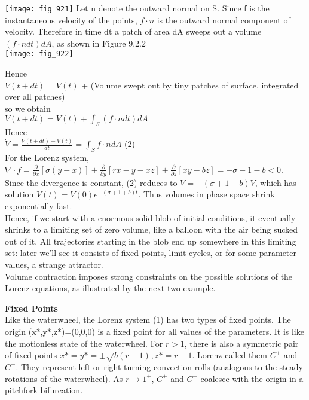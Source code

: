 \documentclass{article}
\newcommand\tab[1][1cm]{\hspace*{#1}}
\begin{document}
\texttt{[image: fig\_921]}
Let n denote the outward normal on S. Since f is the instantaneous velocity of the points, $f \cdot n$ is the outward normal component of velocity. Therefore in time dt a patch of area dA sweeps out a volume $(f \cdot n dt)dA$, as shown in Figure 9.2.2 \\

\texttt{[image: fig\_922]}

Hence \\ \tab \tab
$V(t+dt)=V(t)$ + (Volume swept out by tiny patches of surface, integrated over all patches) \\
so we obtain \\ \tab \tab
$V(t+dt)=V(t)+\int_{S}(f \cdot n dt)dA$ \\
Hence \\ \tab \tab
$\dot{V}=\frac{V(t+dt)-V(t)}{dt}=\int_{S} f \cdot n dA$ \tab (2) \\

For the Lorenz system, \\ \tab \tab
$\nabla \cdot f = \frac{\partial}{\partial x}[\sigma(y-x)]+\frac{\partial}{\partial y}[rx-y-xz]+\frac{\partial}{\partial z}[xy-bz]= -\sigma - 1 - b < 0$. \\
Since the divergence is constant, (2) reduces to $\dot{V}=-(\sigma + 1 + b)V$, which has solution $V(t)=V(0)e^{-(\sigma + 1 + b) t}$. Thus volumes in phase space shrink exponentially fast. \\ \tab
Hence, if we start with a enormous solid blob of initial conditions, it eventually shrinks to a limiting set of zero volume, like a balloon with the air being sucked out of it. All trajectories starting in the blob end up somewhere in this limiting set: later we'll see it consists of fixed points, limit cycles, or for some parameter values, a strange attractor. \\ \tab
Volume contraction imposes strong constraints on the possible solutions of the Lorenz equations, as illustrated by the next two example.

\textbf {Fixed Points} \\ \tab
Like the waterwheel, the Lorenz system (1) has two types of fixed points. The origin (x*,y*,z*)=(0,0,0) is a fixed point for all values of the parameters. It is like the motionless state of the waterwheel. For $r>1$, there is also a symmetric pair of fixed points $x*=y*=\pm \sqrt{b(r-1)}, z*=r-1$. Lorenz called them $C^{+}$ and $C^{-}$. They represent left-or right turning convection rolls (analogous to the steady rotations of the waterwheel). As $r \to 1^{+}$, $C^{+}$ and $C^{-}$ coalesce with the origin in a pitchfork bifurcation. 
\end{document}
